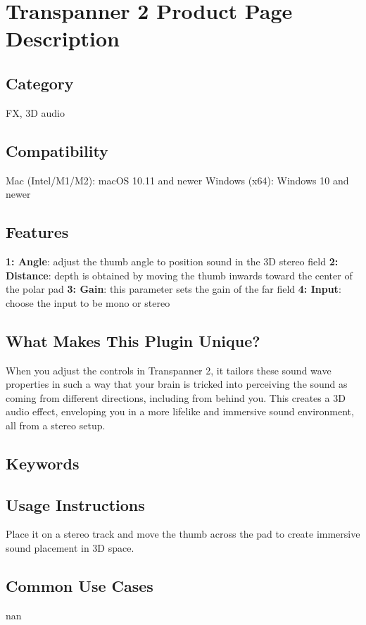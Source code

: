 \section*{Transpanner 2 Product Page Description}

\subsection*{Category}
FX, 3D audio

\subsection*{Compatibility}
Mac (Intel/M1/M2): macOS 10.11 and newer
Windows (x64): Windows 10 and newer

\subsection*{Features}
\textbf{1: Angle}: adjust the thumb angle to position sound in the 3D stereo field
\textbf{2: Distance}: depth is obtained by moving the thumb inwards toward the center of the polar pad
\textbf{3: Gain}: this parameter sets the gain of the far field
\textbf{4: Input}: choose the input to be mono or stereo

\subsection*{What Makes This Plugin Unique?}
When you adjust the controls in Transpanner 2, it tailors these sound wave properties in such a way that your brain is tricked into perceiving the sound as coming from different directions, including from behind you. This creates a 3D audio effect, enveloping you in a more lifelike and immersive sound environment, all from a stereo setup.

\subsection*{Keywords}


\subsection*{Usage Instructions}
Place it on a stereo track and move the thumb across the pad to create immersive sound placement in 3D space. 

\subsection*{Common Use Cases}
nan